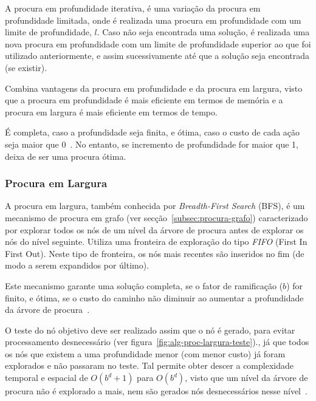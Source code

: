 A procura em profundidade iterativa, é uma variação da procura em profundidade limitada, onde é realizada uma procura em profundidade com um limite de profundidade, $l$.
Caso não seja encontrada uma solução, é realizada uma nova procura em profundidade com um limite de profundidade superior ao que foi utilizado anteriormente, e assim sucessivamente até que a solução seja encontrada (se existir).

Combina vantagens da procura em profundidade e da procura em largura, visto que a procura em profundidade é mais eficiente em termos de memória e a procura em largura é mais eficiente em termos de tempo.

É completa, caso a profundidade seja finita, e ótima, caso o custo de cada ação seja maior que 0~\cite{ist:leic:resumos:procura-cega}.
No entanto, se incremento de profundidade for maior que 1, deixa de ser uma procura ótima.

\subsubsection{Procura em Largura}\label{subsubsec:procura-largura}

A procura em largura, também conhecida por \textit{Breadth-First Search} (BFS), é um mecanismo de procura em grafo (ver secção~\ref{subsec:procura-grafo}) caracterizado por explorar todos os nós de um nível da árvore de procura antes de explorar os nós do nível seguinte. Utiliza uma fronteira de exploração do tipo \textit{FIFO} (First In First Out). Neste tipo de fronteira, os nós mais recentes são inseridos no fim (de modo a serem expandidos por último).

Este mecanismo garante uma solução completa, se o fator de ramificação ($b$) for finito, e ótima, se o custo do caminho não diminuir ao aumentar a profundidade da árvore de procura~\cite{ist:leic:resumos:procura-cega}.

O teste do nó objetivo deve ser realizado assim que o nó é gerado, para evitar processamento desnecessário (ver figura~\ref{fig:alg-proc-largura-teste}).,
já que todos os nós que existem a uma profundidade menor (com menor custo) já foram explorados e não passaram no teste.
Tal permite obter descer a complexidade temporal e espacial de $O(b^d+1)$ para $O(b^d)$, visto que um nível da árvore de procura não é explorado a mais, nem são gerados nós desnecessários nesse nível~\cite{ist:leic:resumos:procura-cega}.

